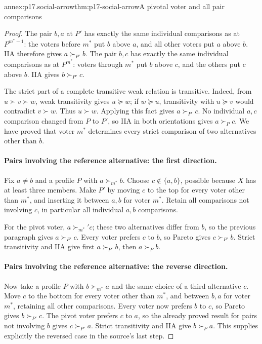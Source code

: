 \begin{annexitem}{annex:p17.social-arrow}{thm:p17-social-arrow}{A pivotal voter and all pair comparisons}
\begin{proof}
The pair \(b,a\) at \(P'\) has exactly the same individual comparisons
as at \(P^{m^*-1}\): the voters before \(m^*\) put \(b\) above \(a\),
and all other voters put \(a\) above \(b\). IIA therefore gives
\(a\succ_{P'}b\).
The pair \(b,c\) has exactly the same individual comparisons as at
\(P^{m^*}\): voters through \(m^*\) put \(b\) above \(c\), and the
others put \(c\) above \(b\). IIA gives \(b\succ_{P'}c\).

The strict part of a complete transitive weak relation is transitive.
Indeed, from \(u\succ v\succ w\), weak transitivity gives \(u\succeq w\);
if \(w\succeq u\), transitivity with \(u\succeq v\) would contradict
\(v\succ w\). Thus \(u\succ w\).
Applying this fact gives \(a\succ_{P'}c\). No individual \(a,c\)
comparison changed from \(P\) to \(P'\), so IIA in both orientations
gives \(a\succ_Pc\). We have proved that voter \(m^*\) determines
every strict comparison of two alternatives other than \(b\).

\paragraph{Pairs involving the reference alternative: the first direction.}
Fix \(a\ne b\) and a profile \(P\) with \(a\succ_{m^*}b\).
Choose \(c\notin\{a,b\}\), possible because \(X\) has at least three
members. Make \(P'\) by moving \(c\) to the top for every voter other
than \(m^*\), and inserting it between \(a,b\) for voter \(m^*\).
Retain all comparisons not involving \(c\), in particular all individual
\(a,b\) comparisons.

For the pivot voter, \(a\succ_{m^*}'c\); these two alternatives differ
from \(b\), so the previous paragraph gives \(a\succ_{P'}c\).
Every voter prefers \(c\) to \(b\), so Pareto gives \(c\succ_{P'}b\).
Strict transitivity and IIA give first \(a\succ_{P'}b\), then
\(a\succ_Pb\).

\paragraph{Pairs involving the reference alternative: the reverse direction.}
Now take a profile \(P\) with \(b\succ_{m^*}a\) and the same choice
of a third alternative \(c\). Move \(c\) to the bottom for every voter
other than \(m^*\), and between \(b,a\) for voter \(m^*\), retaining
all other comparisons. Every voter now prefers \(b\) to \(c\), so
Pareto gives \(b\succ_{P'}c\). The pivot voter prefers \(c\) to \(a\),
so the already proved result for pairs not involving \(b\) gives
\(c\succ_{P'}a\). Strict transitivity and IIA give \(b\succ_Pa\).
This supplies explicitly the reversed case in the source's last step.


\end{proof}
\end{annexitem}
